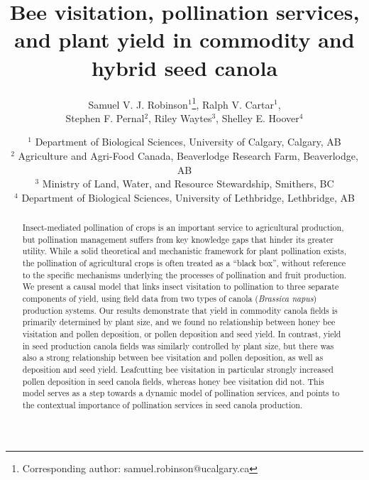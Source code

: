 \documentclass[12pt]{article} %
\title{Bee visitation, pollination services, and plant yield in commodity and hybrid seed canola}
\author{Samuel V. J. Robinson$^1$\footnote{Corresponding author: samuel.robinson@ucalgary.ca}, Ralph V. Cartar$^1$,\\Stephen F. Pernal$^2$, Riley Waytes$^3$, Shelley E. Hoover$^4$}
\date{
$^1$ Department of Biological Sciences, University of Calgary, Calgary, AB\\
$^2$ Agriculture and Agri-Food Canada, Beaverlodge Research Farm, Beaverlodge, AB\\
$^3$ Ministry of Land, Water, and Resource Stewardship, Smithers, BC\\
$^4$ Department of Biological Sciences, University of Lethbridge, Lethbridge, AB
}
\begin{document}
\maketitle
\doublespacing

\begin{abstract}
Insect-mediated pollination of crops is an important service to agricultural production, but pollination management suffers from key knowledge gaps that hinder its greater utility. 
While a solid theoretical and mechanistic framework for plant pollination exists, the pollination of agricultural crops is often treated as a ``black box”, without reference to the specific mechanisms underlying the processes of pollination and fruit production. 
We present a causal model that links insect visitation to pollination to three separate components of yield, using field data from two types of canola (\emph{Brassica napus}) production systems. 
Our results demonstrate that yield in commodity canola fields is primarily determined by plant size, and we found no relationship between honey bee visitation and pollen deposition, or pollen deposition and seed yield. 
In contrast, yield in seed production canola fields was similarly controlled by plant size, but there was also a strong relationship between bee visitation and pollen deposition, as well as deposition and seed yield. 
Leafcutting bee visitation in particular strongly increased pollen deposition in seed canola fields, whereas honey bee visitation did not. 
This model serves as a step towards a dynamic model of pollination services, and points to the contextual importance of pollination services in seed canola production.
\end{abstract}



\end{document}
